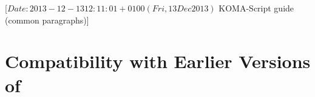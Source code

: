 %
%
%
%
%
%
%
%
% 
%
%
%
%

                 [$Date: 2013-12-13 12:11:01 +0100 (Fri, 13 Dec 2013) $
                  KOMA-Script guide (common paragraphs)]


\makeatletter
{}%
%
%
%
\makeatother


\section{Compatibility with Earlier Versions of \KOMAScript}
\label{sec:\csname label@base\endcsname.compatibilityOptions}
\ifshortversion\IgnoreThisfalse{}\fi%
\ifIgnoreThis %

